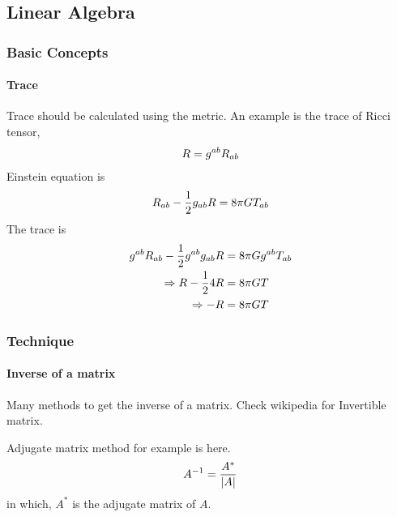 \documentclass[letterpaper,10pt,english]{sphinxmanual}
\begin{document}
\subsection{Linear Algebra}
\label{math:id2}

\subsubsection{Basic Concepts}
\label{math:basic-concepts}

\paragraph{Trace}
\label{math:trace}
Trace should be calculated using the metric. An example is the trace of Ricci tensor,
\begin{gather}
\begin{split}R=g^{ab}R_{ab}\end{split}\notag
\end{gather}
Einstein equation is
\begin{gather}
\begin{split}R_{ab}-\frac{1}{2}g_{ab}R=8\pi G T_{ab}\end{split}\notag
\end{gather}
The trace is
\begin{gather}
\begin{split}g^{ab}R_{ab}-\frac{1}{2}g^{ab}g_{ab}R &= 8\pi G g^{ab}T_{ab} \\
\Rightarrow R-\frac{1}{2} 4 R  &=  8\pi G T \\
\Rightarrow -R &= 8\pi GT\end{split}\notag
\end{gather}

\subsubsection{Technique}
\label{math:technique}

\paragraph{Inverse of a matrix}
\label{math:inverse-of-a-matrix}
Many methods to get the inverse of a matrix. Check wikipedia for Invertible matrix.

Adjugate matrix method for example is here.
\begin{gather}
\begin{split}A^{-1} = \frac{A^*}{|A|}\end{split}\notag
\end{gather}
in which, \(A^*\) is the adjugate matrix of \(A\).
\end{document}
